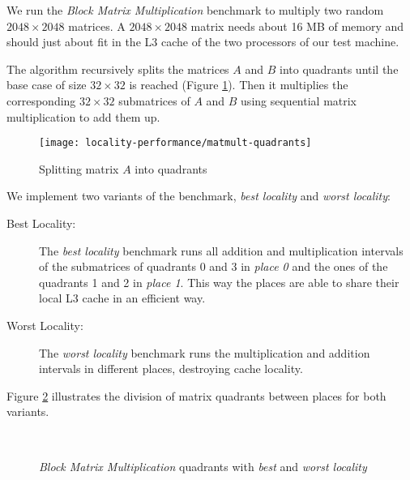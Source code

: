We run the \emph{Block Matrix Multiplication} benchmark to multiply
two random $2048 \times 2048$ matrices. A $2048 \times 2048$ matrix
needs about 16 MB of memory and should just about fit in the L3 cache
of the two processors of our test machine. 

The algorithm recursively splits the matrices $A$ and $B$ into
quadrants until the base case of size $32 \times 32$ is reached
(Figure \ref{fig:locality-performance-matmult-quadrants}). Then it
multiplies the corresponding $32 \times 32$ submatrices of $A$ and $B$
using sequential matrix multiplication to add them up.

\begin{figure}[!ht]
  \centering
  \texttt{[image: locality-performance/matmult-quadrants]}
  \caption{Splitting matrix $A$ into quadrants}
  \label{fig:locality-performance-matmult-quadrants}
\end{figure}

We implement two variants of the benchmark, \emph{best locality} and
\emph{worst locality}:

\begin{description}
\item[Best Locality:] The \emph{best locality} benchmark runs all
  addition and multiplication intervals of the submatrices of
  quadrants 0 and 3 in \emph{place 0} and the ones of the quadrants 1
  and 2 in \emph{place 1}. This way the places are able to share their
  local L3 cache in an efficient way.
\item[Worst Locality:] The \emph{worst locality} benchmark runs the
  multiplication and addition intervals in different places,
  destroying cache locality.
\end{description}

Figure \ref{fig:locality-performance-matmult-locality} illustrates the
division of matrix quadrants between places for both variants.

\begin{figure}[!ht]
  \centering
  \\
  \caption{\emph{Block Matrix Multiplication} quadrants with \emph{best} and \emph{worst locality}}
  \label{fig:locality-performance-matmult-locality}
\end{figure}

